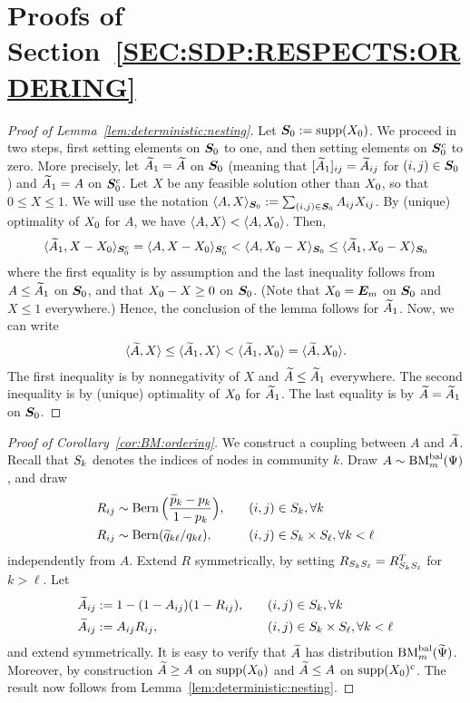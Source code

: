 \section{Proofs of Section~\ref{SEC:SDP:RESPECTS:ORDERING}}\label{sec:proof:SDP:respects:ordering}
\begin{proof}[Proof of Lemma~\ref{lem:deterministic:nesting}]
  Let $\bm{S}_0 := \operatorname{supp}(X_0)$. We proceed in two steps, first setting elements on $\bm{S}_0$ to one, and then setting elements on $\bm{S}_0^c$ to zero. 
  More precisely, let $\widetilde{A}_1 = \widetilde{A}$ on $\bm{S}_0$ (meaning that $[\widetilde{A}_1]_{ij} = \widetilde{A}_{ij}$ for $(i,j) \in \bm{S}_0$) and $\widetilde{A}_1 = A$ on $\bm{S}_0^c$.
  Let $X$ be any feasible solution other than $X_0$, so that $0 \le X\le 1$. We will use the notation $\langle A,X\rangle_{\bm{S}_0} := \sum_{(i,j)\in \bm{S}_0} A_{ij} X_{ij}$. By (unique) optimality of $X_0$ for $A$, we have $\langle A,X\rangle < \langle A,X_0\rangle$. Then,
  \begin{align*}
       \langle \widetilde{A}_1,X-X_0\rangle_{\bm{S}_0^c}  = \langle A,X-X_0\rangle_{\bm{S}_0^c} < \langle A,X_0-X\rangle_{\bm{S}_0} \le \langle \widetilde{A}_1,X_0-X\rangle_{\bm{S}_0}
  \end{align*}
  where the first equality is by assumption and the last inequality follows from $A \le \widetilde{A}_1$ on $\bm{S}_0$, and that $X_0 - X \ge 0$ on $\bm{S}_0$. (Note that $X_0 = \bm{E}_m$ on $\bm{S}_0$ and $X \le 1$ everywhere.) Hence, the conclusion of the lemma follows for $\widetilde{A}_1$.  Now, we can write
  \begin{align*}
    \langle \widetilde{A},X\rangle \le \langle \widetilde{A}_1,X\rangle < \langle \widetilde{A}_1,X_0\rangle = \langle \widetilde{A},X_0\rangle.
  \end{align*}
  The first inequality is by nonnegativity of $X$ and $\widetilde{A} \le \widetilde{A}_1$ everywhere. The second inequality is by (unique) optimality of $X_0$ for $\widetilde{A}_1$. The last equality is by $\widetilde{A} = \widetilde{A}_1$ on $\bm{S}_0$.
\end{proof}

\begin{proof}[Proof of Corollary~\ref{cor:BM:ordering}]
   We construct a coupling between $A$ and $\widetilde{A}$. Recall that $S_{k}$ denotes the indices of nodes in community $k$. Draw $A \sim \textrm{BM}^{\textrm{bal}}_m(\Psi)$, and draw
   \begin{alignat*}{3}
    R_{ij} &\sim \operatorname{Bern}\Big(\frac{\widetilde{p}_k - p_k}{1- p_k}\Big), &&\quad (i,j)\in S_{k}, \forall k\\
    R_{ij} &\sim \operatorname{Bern}(\widetilde{q}_{k \ell}/q_{k \ell}), &&\quad (i,j)\in S_{k} \times S_{\ell}, \forall k < \ell
   \end{alignat*}
   independently from $A$. Extend $R$ symmetrically, by setting $R_{S_{k}S_{\ell}} = R_{S_{k}S_{\ell}}^T$ for $k > \ell$. Let 
   \begin{alignat*}{3}
    \widetilde{A}_{ij} &:= 1-(1-A_{ij})(1-R_{ij}), &&\quad (i,j)\in S_{k}, \forall k\\
    \widetilde{A}_{ij} &:= A_{ij}R_{ij}, &&\quad (i,j)\in S_{k}\times S_{\ell}, \forall k < \ell
   \end{alignat*}
   and extend symmetrically. It is easy to verify that $\widetilde{A}$ has distribution $\textrm{BM}^{\textrm{bal}}_m(\widetilde{\Psi})$. Moreover, by construction $\widetilde{A} \ge A$ on $\operatorname{supp}(X_0)$ and $\widetilde{A} \le A$ on $\operatorname{supp}(X_0)^c$. The result now follows from Lemma~\ref{lem:deterministic:nesting}.
\end{proof}


